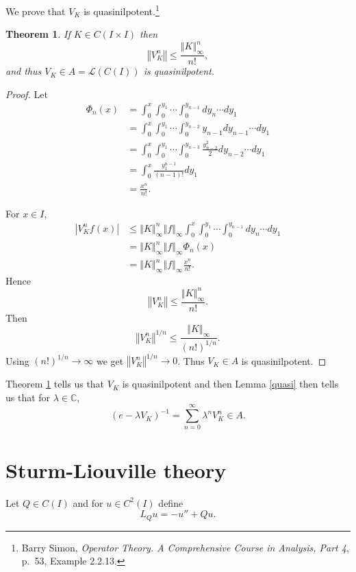 \documentclass{article}
\newcommand{\norm}[1]{\left\Vert #1 \right\Vert}
\newtheorem{theorem}{Theorem}
\theoremstyle{definition}
\begin{document}
We prove that $V_K$ is quasinilpotent.\footnote{Barry Simon, {\em Operator Theory. A Comprehensive Course in Analysis, Part 4},
p.~53, Example 2.2.13.}

\begin{theorem}
If $K \in C(I \times I)$ then 
\[
\norm{V_K^n} \leq \frac{\norm{K}_\infty^n}{n!},
\]
and thus $V_K \in A=\mathscr{L}(C(I))$ is quasinilpotent.
\label{2213}
\end{theorem}
\begin{proof}
Let
\begin{align*}
\Phi_n(x)&=\int_0^x \int_0^{y_1} \cdots \int_0^{y_{n-1}} 
dy_n \cdots dy_1\\
&=\int_0^x \int_0^{y_1} \cdots \int_0^{y_{n-2}}
y_{n-1} dy_{n-1} \cdots dy_1\\
&=\int_0^x \int_0^{y_1} \cdots \int_0^{y_{n-3}}
\frac{y_{n-2}^2}{2} dy_{n-2} \cdots dy_1\\
&=\int_0^x \frac{y_1^{n-1}}{(n-1)!} dy_1\\
&=\frac{x^n}{n!}.
\end{align*}

For $x \in I$,
\begin{align*}
|V_K^n f(x)|&\leq
\norm{K}_\infty^n \norm{f}_\infty \int_0^x \int_0^{y_1} \cdots \int_0^{y_{n-1}} dy_n \cdots dy_1\\
&=\norm{K}_\infty^n \norm{f}_\infty \Phi_n(x)\\
&=\norm{K}_\infty^n \norm{f}_\infty \frac{x^n}{n!}.
\end{align*}
Hence 
\[
\norm{V_K^n} \leq \frac{\norm{K}_\infty^n}{n!}. 
\]
Then
\[
\norm{V_K^n}^{1/n} \leq \frac{\norm{K}_\infty}{(n!)^{1/n}}.
\]
Using $(n!)^{1/n} \to \infty$ we get $\norm{V_K^n}^{1/n} \to 0$.
Thus $V_K \in A$ is quasinilpotent.
\end{proof}

Theorem \ref{2213} tells us that $V_K$ is quasinilpotent and then
Lemma \ref{quasi} then tells us that for $\lambda \in \mathbb{C}$,
\begin{equation}
(e-\lambda V_K)^{-1}=\sum_{n=0}^\infty \lambda^n V_K^n \in A.
\label{VKquasi}
\end{equation}




\section{Sturm-Liouville theory}
Let $Q \in C(I)$ and for $u \in C^2(I)$ define 
\[
L_Q u = -u''+Qu.
\]
\end{document}

